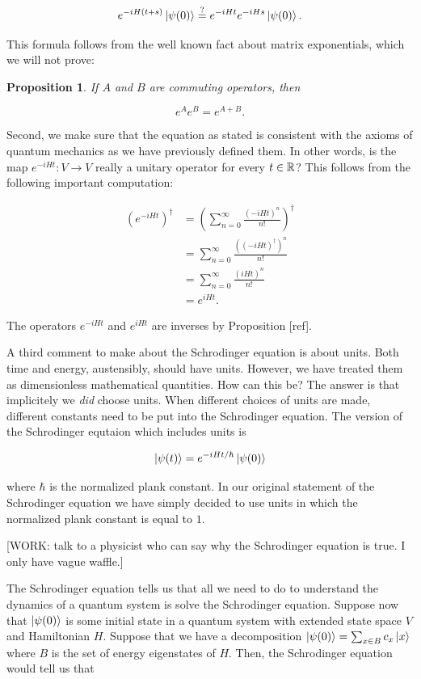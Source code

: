 \documentclass{article}
\newtheorem{proposition}{Proposition}[section]
\theoremstyle{definition}
\numberwithin{figure}{section}
\begin{document}
$$e^{-i H (t+s)}\ket{\psi(0)}\stackrel{?}{=}e^{- i H t} e^{- i H s}\ket{\psi(0)}.$$

This formula follows from the well known fact about matrix exponentials, which we will not prove:

\begin{proposition} If $A$ and $B$ are commuting operators, then

$$e^{A}e^{B}=e^{A+B}.$$
\end{proposition}

Second, we make sure that the equation as stated is consistent with the axioms of quantum mechanics as we have previously defined them. In other words, is the map $e^{-iHt}: V\to V$ really a unitary operator for every $t\in \mathbb{R}$? This follows from the following important computation:

\begin{align*}
\left(e^{-iHt}\right)^\dagger &= \left(\sum_{n=0}^{\infty}\frac{(-i H t)^n}{n!}\right)^{\dagger}\\
&= \sum_{n=0}^{\infty}\frac{\left((-i H t)^\dagger\right)^n}{n!}\\
&= \sum_{n=0}^{\infty}\frac{\left(i H t\right)^n}{n!}\\
&=e^{i H t}.
\end{align*}

The operators $e^{- i H t}$ and $e^{i H t}$ are inverses by Proposition [ref].

A third comment to make about the Schrodinger equation is about units. Both time and energy, austensibly, should have units. However, we have treated them as dimensionless mathematical quantities. How can this be? The answer is that implicitely we \textit{did} choose units. When different choices of units are made, different constants need to be put into the Schrodinger equation. The version of the Schrodinger equtaion which includes units is

$$\ket{\psi(t)}=e^{-i H t/\hbar}\ket{\psi(0)}$$

where $\hbar$ is the normalized plank constant. In our original statement of the Schrodinger equation we have simply decided to use units in which the normalized plank constant is equal to $1$.

[WORK: talk to a physicist who can say why the Schrodinger equation is true. I only have vague waffle.]

The Schrodinger equation tells us that all we need to do to understand the dynamics of a quantum system is solve the Schrodinger equation. Suppose now that $\ket{\psi(0)}$ is some initial state in a quantum system with extended state space $V$ and Hamiltonian $H$. Suppose that we have a decomposition $\ket{\psi(0)}=\sum_{x\in B}c_x \ket{x}$ where $B$ is the set of energy eigenstates of $H$. Then, the Schrodinger equation would tell us that
\end{document}
